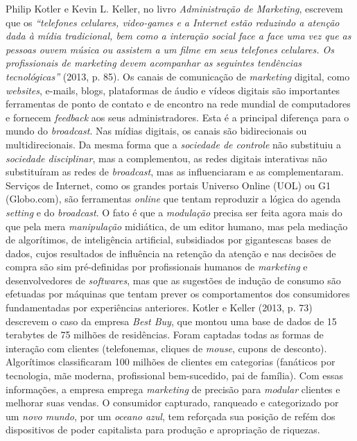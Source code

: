 Philip Kotler e Kevin L. Keller, no livro \emph{Administração de
Marketing}, escrevem que os \emph{``telefones celulares, video-games e a
Internet estão reduzindo a atenção dada à mídia tradicional, bem como a
interação social face a face uma vez que as pessoas ouvem música ou
assistem a um filme em seus telefones celulares. Os profissionais de
marketing devem acompanhar as seguintes tendências tecnológicas''}
(2013, p. 85). Os canais de comunicação de \emph{marketing} digital,
como \emph{websites}, e-mails, blogs, plataformas de áudio e vídeos
digitais são importantes ferramentas de ponto de contato e de encontro
na rede mundial de computadores e fornecem \emph{feedback} aos seus
administradores. Esta é a principal diferença para o mundo do
\emph{broadcast}. Nas mídias digitais, os canais são bidirecionais ou
multidirecionais. Da mesma forma que a \emph{sociedade de controle} não
substituiu a \emph{sociedade disciplinar}, mas a complementou, as redes
digitais interativas não substituíram as redes de \emph{broadcast}, mas
as influenciaram e as complementaram. Serviços de Internet, como os
grandes portais Universo Online (UOL) ou G1 (Globo.com), são ferramentas
\emph{online} que tentam reproduzir a lógica do agenda \emph{setting} e
do \emph{broadcast}. O fato é que a \emph{modulação} precisa ser feita
agora mais do que pela mera \emph{manipulação} midiática, de um editor
humano, mas pela mediação de algorítimos, de inteligência artificial,
subsidiados por gigantescas bases de dados, cujos resultados de
influência na retenção da atenção e nas decisões de compra são sim
pré-definidas por profissionais humanos de \emph{marketing} e
desenvolvedores de \emph{softwares}, mas que as sugestões de indução de
consumo são efetuadas por máquinas que tentam prever os comportamentos
dos consumidores fundamentadas por experiências anteriores. Kotler e
Keller (2013, p. 73) descrevem o caso da empresa \emph{Best Buy}, que
montou uma base de dados de 15 terabytes de 75 milhões de residências.
Foram captadas todas as formas de interação com clientes (telefonemas,
cliques de \emph{mouse}, cupons de desconto). Algorítimos classificaram
100 milhões de clientes em categorias (fanáticos por tecnologia, mãe
moderna, profissional bem-sucedido, pai de família). Com essas
informações, a empresa emprega \emph{marketing} de precisão para
\emph{modular} clientes e melhorar suas vendas. O consumidor capturado,
ranqueado e categorizado por um \emph{novo mundo}, por um \emph{oceano
azul}, tem reforçada sua posição de refém dos dispositivos de poder
capitalista para produção e apropriação de riquezas.

